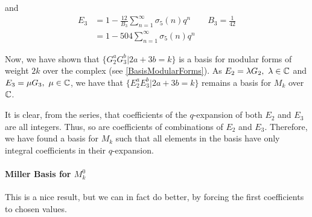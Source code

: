 and
\begin{align*}
	E_3 &= 1 - \frac{12}{B_3} \sum_{n=1}^{\infty} \sigma_{5}(n)q^n \qquad B_3 = \frac{1}{42} \\
	    &= 1 - 504 \sum_{n=1}^{\infty} \sigma_{5}(n)q^n
\end{align*}

Now, we have shown that $\{G_2^aG_3^b | 2a+3b=k\}$ is a basis for modular forms of weight $2k$ over the complex (see \ref{BasisModularForms}).
As $E_2 = \lambda G_2,\ \lambda \in \mathbb{C}$ and $E_3 = \mu G_3,\ \mu \in \mathbb{C}$, we have that $\{E_2^aE_3^b | 2a+3b=k\}$ remains a basis for $M_k$ over $\mathbb{C}$.

It is clear, from the series, that coefficients of the $q$-expansion of both $E_2$ and $E_3$ are all integers.
Thus, so are coefficients of combinations of $E_2$ and $E_3$.
Therefore, we have found a basis for $M_k$ such that all elements in the basis have only integral coefficients in their $q$-expansion.
\label{IntegralBasisModularForms}

\paragraph{Miller Basis for $M_k^0$}
This is a nice result, but we can in fact do better, by forcing the first coefficients to chosen values.


